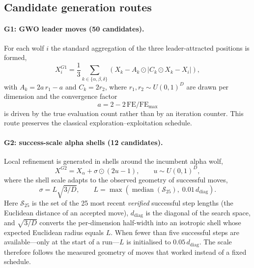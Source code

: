 \documentclass[11pt,a4paper]{article}
\newcommand{\sS}{\mathcal{S}}
\begin{document}
\subsection{Candidate generation routes}
\paragraph{G1: GWO leader moves (50 candidates).} For each wolf $i$ the
standard aggregation of the three leader-attracted positions is formed,
\begin{equation}
X_i^{G1}=\frac{1}{3}\sum_{k\in\{\alpha,\beta,\delta\}}
\left(X_k - A_k \odot \left| C_k \odot X_k - X_i \right|\right),
\end{equation}
with $A_k=2a\,r_1-a$ and $C_k=2r_2$, where $r_1,r_2\sim U(0,1)^D$ are drawn
per dimension and the convergence factor
\begin{equation}
a=2-2\,\mathrm{FE}/\mathrm{FE}_{\max}
\end{equation}
is driven by the true evaluation count rather than by an iteration counter.
This route preserves the classical exploration--exploitation schedule.

\paragraph{G2: success-scale alpha shells (12 candidates).} Local refinement is
generated in shells around the incumbent alpha wolf,
\begin{equation}
X^{G2}=X_\alpha+\sigma\odot(2u-1),\qquad u\sim U(0,1)^D,
\end{equation}
where the shell scale adapts to the observed geometry of successful moves,
\begin{equation}
\sigma=L\sqrt{3/D},\qquad
L=\max\!\left(\operatorname{median}(\sS_{25}),\;0.01\,d_{\mathrm{diag}}\right).
\label{eq:sigma}
\end{equation}
Here $\sS_{25}$ is the set of the 25 most recent \emph{verified} successful
step lengths (the Euclidean distance of an accepted move), $d_{\mathrm{diag}}$
is the diagonal of the search space, and $\sqrt{3/D}$ converts the
per-dimension half-width into an isotropic shell whose expected Euclidean
radius equals $L$. When fewer than five successful steps are available---only
at the start of a run---$L$ is initialised to $0.05\,d_{\mathrm{diag}}$. The
scale therefore follows the measured geometry of moves that worked instead of
a fixed schedule.
\end{document}
